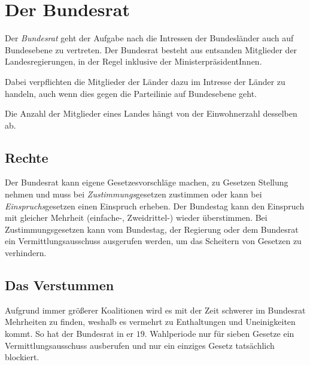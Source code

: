 \documentclass{article}
\begin{document}
\section{Der Bundesrat}
Der \emph{Bundesrat} geht der Aufgabe nach die Intressen der Bundesländer auch auf Bundesebene zu vertreten. Der Bundesrat besteht aus entsanden Mitglieder der Landesregierungen, in der Regel inklusive der MinisterpräsidentInnen.
 
Dabei verpflichten die Mitglieder der Länder dazu im Intresse der Länder zu handeln, auch wenn dies gegen die Parteilinie auf Bundesebene geht.
 
Die Anzahl der Mitglieder eines Landes hängt von der Einwohnerzahl desselben ab. 
 
\subsection{Rechte}
Der Bundesrat kann eigene Gesetzesvorschläge machen, zu Gesetzen Stellung nehmen und muss bei \emph{Zustimmungs}gesetzen zustimmen oder kann bei \emph{Einspruchs}gesetzen einen Einspruch erheben. Der Bundestag kann den Einspruch mit gleicher Mehrheit (einfache-, Zweidrittel-) wieder überstimmen. Bei Zustimmungsgesetzen kann vom Bundestag, der Regierung oder dem Bundesrat ein Vermittlungsausschuss ausgerufen werden, um das Scheitern von Gesetzen zu verhindern.
 
\subsection{Das Verstummen}
Aufgrund immer größerer Koalitionen wird es mit der Zeit schwerer im Bundesrat Mehrheiten zu finden, weshalb es vermehrt zu Enthaltungen und Uneinigkeiten kommt. So hat der Bundesrat in er $19.$ Wahlperiode nur für sieben Gesetze ein Vermittlungsausschuss ausberufen und nur ein einziges Gesetz tatsächlich blockiert.   
\end{document}
